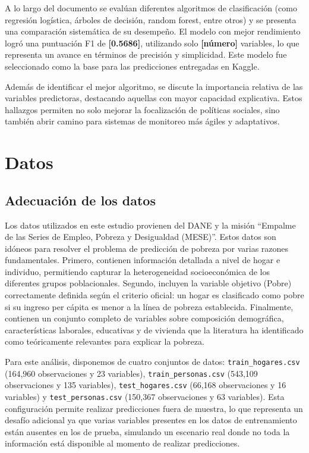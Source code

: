 \documentclass[12pt,a4paper,onecolumn]{article}
\begin{document}
A lo largo del documento se evalúan diferentes algoritmos de clasificación (como regresión logística, árboles de decisión, random forest, entre otros) y se presenta una comparación sistemática de su desempeño. El modelo con mejor rendimiento logró una puntuación F1 de \textbf{[0.5686]}, utilizando solo \textbf{[número]} variables, lo que representa un avance en términos de precisión y simplicidad. Este modelo fue seleccionado como la base para las predicciones entregadas en Kaggle.

Además de identificar el mejor algoritmo, se discute la importancia relativa de las variables predictoras, destacando aquellas con mayor capacidad explicativa. Estos hallazgos permiten no solo mejorar la focalización de políticas sociales, sino también abrir camino para sistemas de monitoreo más ágiles y adaptativos.

\section{Datos}

\subsection{Adecuación de los datos}

Los datos utilizados en este estudio provienen del DANE y la misión ``Empalme de las Series de Empleo, Pobreza y Desigualdad (MESE)''. Estos datos son idóneos para resolver el problema de predicción de pobreza por varias razones fundamentales. Primero, contienen información detallada a nivel de hogar e individuo, permitiendo capturar la heterogeneidad socioeconómica de los diferentes grupos poblacionales. Segundo, incluyen la variable objetivo (Pobre) correctamente definida según el criterio oficial: un hogar es clasificado como pobre si su ingreso per cápita es menor a la línea de pobreza establecida. Finalmente, contienen un conjunto completo de variables sobre composición demográfica, características laborales, educativas y de vivienda que la literatura ha identificado como teóricamente relevantes para explicar la pobreza.

Para este análisis, disponemos de cuatro conjuntos de datos: \texttt{train\_hogares.csv} (164,960 observaciones y 23 variables), \texttt{train\_personas.csv} (543,109 observaciones y 135 variables), \texttt{test\_hogares.csv} (66,168 observaciones y 16 variables) y \texttt{test\_personas.csv} (150,367 observaciones y 63 variables). Esta configuración permite realizar predicciones fuera de muestra, lo que representa un desafío adicional ya que varias variables presentes en los datos de entrenamiento están ausentes en los de prueba, simulando un escenario real donde no toda la información está disponible al momento de realizar predicciones.
\end{document}
